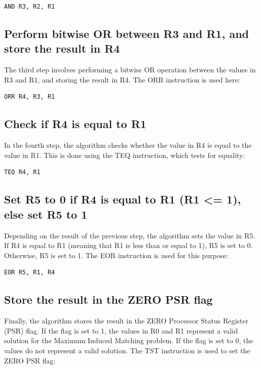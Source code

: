 \begin{verbatim}
AND R3, R2, R1
\end{verbatim}

\subsection{Perform bitwise OR between R3 and R1, and store the result in R4}

The third step involves performing a bitwise OR operation between the values in R3 and R1, and storing the result in R4. The ORR instruction is used here:

\begin{verbatim}
ORR R4, R3, R1
\end{verbatim}

\subsection{Check if R4 is equal to R1}

In the fourth step, the algorithm checks whether the value in R4 is equal to the value in R1. This is done using the TEQ instruction, which tests for equality:

\begin{verbatim}
TEQ R4, R1
\end{verbatim}

\subsection{Set R5 to 0 if R4 is equal to R1 (R1 <= 1), else set R5 to 1}

Depending on the result of the previous step, the algorithm sets the value in R5. If R4 is equal to R1 (meaning that R1 is less than or equal to 1), R5 is set to 0. Otherwise, R5 is set to 1. The EOR instruction is used for this purpose:

\begin{verbatim}
EOR R5, R1, R4
\end{verbatim}

\subsection{Store the result in the ZERO PSR flag}

Finally, the algorithm stores the result in the ZERO Processor Status Register (PSR) flag. If the flag is set to 1, the values in R0 and R1 represent a valid solution for the Maximum Induced Matching problem. If the flag is set to 0, the values do not represent a valid solution. The TST instruction is used to set the ZERO PSR flag:

